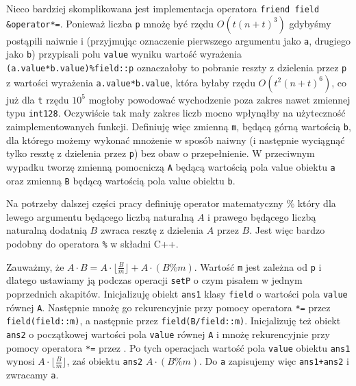 \documentclass{article}
\begin{document}
Nieco bardziej skomplikowana jest implementacja operatora \texttt{friend field \&operator*=}. Ponieważ liczba 
\texttt{p} mnożę być rzędu $O(t(n+t)^3)$ gdybyśmy postąpili naiwnie i (przyjmując 
oznaczenie pierwszego argumentu jako \texttt{a}, drugiego jako \texttt{b}) 
przypisali polu \texttt{value} wyniku wartość wyrażenia
\newline \texttt{(a.value*b.value)\%field::p} oznaczałoby to pobranie reszty z dzielenia przez \texttt{p} z 
wartości wyrażenia
\texttt{a.value*b.value}, która 
byłaby rzędu $O(t^2(n+t)^6)$, co już dla \texttt{t} rzędu $10^5$ mogłoby powodować 
wychodzenie poza zakres nawet zmiennej typu 
\texttt{\textunderscore \textunderscore int128}. 
Oczywiście tak mały zakres liczb mocno wpłynąłby na użyteczność
zaimplementowanych funkcji. Definiuję więc zmienną \texttt{m}, będącą 
górną wartością \texttt{b}, dla którego możemy wykonać mnożenie w sposób naiwny 
(i następnie wyciągnąć tylko resztę z dzielenia przez \texttt{p}) bez obaw o przepełnienie.
W przeciwnym wypadku tworzę zmienną pomocniczą \texttt{A} będącą wartością pola value
obiektu \texttt{a} oraz zmienną \texttt{B} będącą wartością pola value obiektu 
\texttt{b}.
\begin{tcolorbox}
\begin{center}
    Na potrzeby dalszej części pracy definiuję operator matematyczny $\%$ który dla lewego 
    argumentu będącego liczbą naturalną $A$ i prawego będącego liczbą naturalną dodatnią 
    $B$ zwraca resztę z dzielenia $A$ przez $B$. Jest więc bardzo podobny do operatora 
    \texttt{\%} w składni C++.
\end{center}    
\end{tcolorbox}
Zauważmy, że $A \cdot B = A \cdot \lfloor \frac{B}{m} \rfloor  + A \cdot (B \% m)$. 
Wartość \texttt{m} jest zależna od \texttt{p} i dlatego ustawiamy ją podczas operacji 
\texttt{setP} o czym pisałem w 
jednym poprzednich akapitów. Inicjalizuję obiekt \texttt{ans1} klasy \texttt{field} o wartości pola \texttt{value} równej \texttt{A}.
Następnie mnożę go rekurencyjnie przy pomocy operatora \texttt{*=} przez \texttt{field(field::m)}, a następnie przez 
\texttt{field(B/field::m)}. Inicjalizuję też obiekt \texttt{ans2} o początkowej wartości pola \texttt{value}
równej \texttt{A} i mnożę rekurencyjnie przy pomocy operatora \texttt{*=} przez . 
Po tych operacjach wartość pola \texttt{value} obiektu \texttt{ans1} wynosi $A \cdot \lfloor \frac{B}{m} \rfloor$, zaś 
obiektu \texttt{ans2} $A \cdot (B \% m)$. Do \texttt{a} zapisujemy więc \texttt{ans1+ans2} i zwracamy \texttt{a}.
\end{document}
